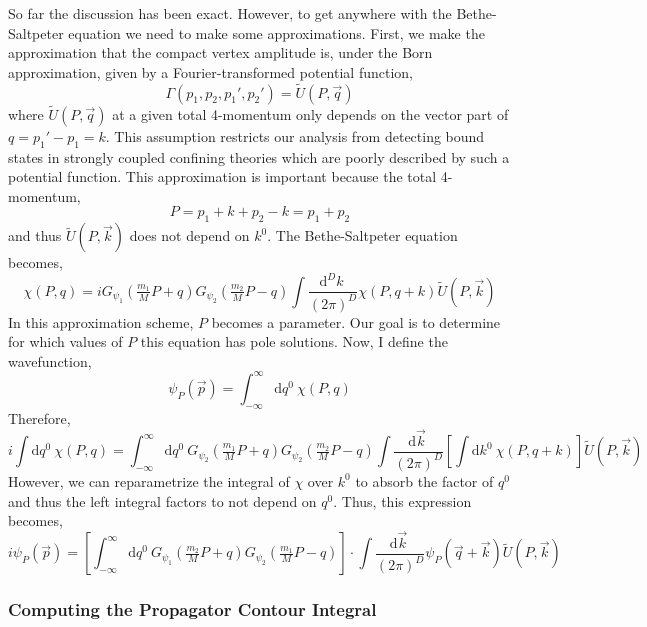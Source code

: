 \documentclass[12pt]{article}
\renewcommand{\d}[1]{ \mathrm{d}#1 \:}
\newcommand{\dn}[2]{ \mathrm{d}^{#1} #2 \:}
\begin{document}
So far the discussion has been exact. However, to get anywhere with the Bethe-Saltpeter equation we need to make some approximations. First, we make the approximation that the compact vertex amplitude is, under the Born approximation, given by a Fourier-transformed potential function,
\begin{equation}
\Gamma(p_1, p_2, p_1', p_2') = \tilde{U}(P, \vec{q}) 
\end{equation}
where $\tilde{U}(P, \vec{q})$ at a given total 4-momentum only depends on the vector part of $q = p_1' - p_1 = k$. This assumption restricts our analysis from detecting bound states in strongly coupled confining theories which are poorly described by such a potential function. This approximation is important because the total 4-momentum, 
\begin{equation}
P = p_1 + k + p_2 - k = p_1 + p_2
\end{equation} 
and thus $\tilde{U}(P, \vec{k})$ does not depend on $k^0$. The Bethe-Saltpeter equation becomes,
\begin{equation}
\chi(P, q) = i G_{\psi_1}(\tfrac{m_1}{M} P + q) G_{\psi_2}(\tfrac{m_2}{M} P - q) \int \frac{\dn{D}{k}}{(2\pi)^D} \chi(P, q + k) \tilde{U}(P, \vec{k}) 
\end{equation}
In this approximation scheme, $P$ becomes a parameter. Our goal is to determine for which values of $P$ this equation has pole solutions.  
Now, I define the wavefunction,
\begin{equation}
\psi_P(\vec{p}) = \int_{-\infty}^{\infty} \d{q^0} \chi(P, q) 
\end{equation}
Therefore, 
\begin{equation}
i \int \d{q^0} \chi(P, q) = \int_{-\infty}^{\infty} \d{q^0}  G_{\psi_2}(\tfrac{m_1}{M} P + q) G_{\psi_2}(\tfrac{m_2}{M} P - q) \int \frac{\d{\vec{k}}}{(2\pi)^{D}} \left[ \int \d{k^0} \chi(P, q + k) \right] \tilde{U}(P, \vec{k}) 
\end{equation}
However, we can reparametrize the integral of $\chi$ over $k^0$ to absorb the factor of $q^0$ and thus the left integral factors to not depend on $q^0$. Thus, this expression becomes,
\begin{equation}
i \psi_P(\vec{p}) = \left[ \int_{-\infty}^{\infty} \d{q^0} G_{\psi_1}(\tfrac{m_2}{M} P + q) G_{\psi_2}(\tfrac{m_1}{M} P - q) \right] \cdot \int \frac{\d{\vec{k}}}{(2\pi)^{D}} \psi_P(\vec{q} + \vec{k}) \tilde{U}(P, \vec{k}) 
\end{equation}

\subsubsection{Computing the Propagator Contour Integral}
\end{document}
